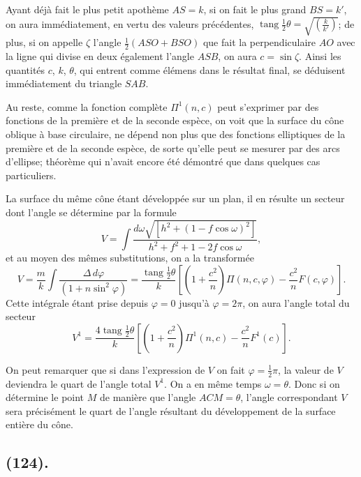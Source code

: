 \documentclass{article}
\begin{document}
Ayant déjà fait le plus petit apothème $AS=k$, si on fait le plus grand $BS=k'$, on aura immédiatement, en vertu des valeurs précédentes, $\operatorname{tang}\frac{1}{2}\theta=\sqrt{\left(\frac{k}{k'}\right)}$; de plus, si on appelle $\zeta$ l'angle $\frac{1}{2}(ASO+BSO)$ que fait la perpendiculaire $AO$ avec la ligne qui divise en deux également l'angle $ASB$, on aura $c=\sin\zeta$. Ainsi les quantités $c$, $k$, $\theta$, qui entrent comme élémens dans le résultat final, se déduisent immédiatement du triangle $SAB$.

Au reste, comme la fonction complète $\Pi^{1}(n,c)$ peut s'exprimer par des fonctions de la première et de la seconde espèce, on voit que la surface du cône oblique à base circulaire, ne dépend non plus que des fonctions elliptiques de la première et de la seconde espèce, de sorte qu'elle peut se mesurer par des arcs d'ellipse; théorème qui n'avait encore été démontré que dans quelques cas particuliers.

La surface du même cône étant développée sur un plan, il en résulte un secteur dont l'angle se détermine par la formule
\[ V=\int\frac{d\omega\sqrt{[h^{2}+(1-f\cos\omega)^{2}]}}{h^{2}+f^{2}+1-2f\cos\omega}, \]
et au moyen des mêmes substitutions, on a la transformée
\[ V=\frac{m}{k}\int\frac{\Delta\,d\varphi}{(1+n\sin^{2}\varphi)}=\frac{\operatorname{tang}\tfrac{1}{2}\theta}{k}\left[\left(1+\frac{c^{2}}{n}\right)\Pi(n,c,\varphi)-\frac{c^{2}}{n}F(c,\varphi)\right]. \]
Cette intégrale étant prise depuis $\varphi=0$ jusqu'à $\varphi=2\pi$, on aura l'angle total du secteur
\[ V^{1}=\frac{4\operatorname{tang}\tfrac{1}{2}\theta}{k}\left[\left(1+\frac{c^{2}}{n}\right)\Pi^{1}(n,c)-\frac{c^{2}}{n}F^{1}(c)\right]. \]

On peut remarquer que si dans l'expression de $V$ on fait $\varphi=\frac{1}{2}\pi$, la valeur de $V$ deviendra le quart de l'angle total $V^{1}$. On a en même temps $\omega=\theta$. Donc si on détermine le point $M$ de manière que l'angle $ACM=\theta$, l'angle correspondant $V$ sera précisément le quart de l'angle résultant du développement de la surface entière du cône.

\subsection*{(124).}
\end{document}
